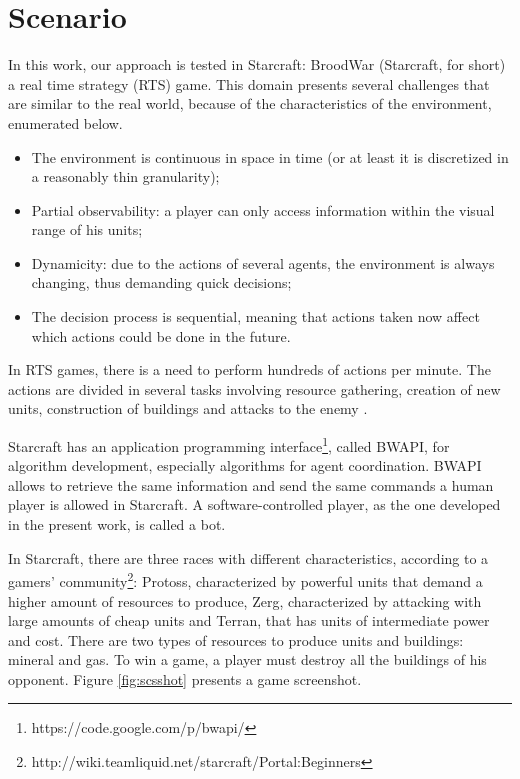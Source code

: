 \documentclass[conference]{IEEEtran}
\begin{document}
\section{Scenario}
\label{sec:scenario}

In this work, our approach is tested in Starcraft: BroodWar (Starcraft, for short) a real time strategy (RTS) game. This domain presents several challenges that are similar to the real world, because of the characteristics of the environment, enumerated below.

\begin{itemize}
	\item The environment is continuous in space in time (or at least it is discretized in a reasonably thin granularity);
	\item Partial observability: a player can only access information within the visual range of his units;
	\item Dynamicity: due to the actions of several agents, the environment is always changing, thus demanding quick decisions;
	\item The decision process is sequential, meaning that actions taken now affect which actions could be done in the future.
\end{itemize}

In RTS games, there is a need to perform hundreds of actions per minute. The actions are divided in several tasks involving resource gathering, creation of new units, construction of buildings and attacks to the enemy \cite{Weber+2011}.

Starcraft has an application programming interface\footnote{https://code.google.com/p/bwapi/}, called BWAPI, for algorithm development, especially algorithms for agent coordination. BWAPI allows to retrieve the same information and send the same commands a human player is allowed in Starcraft. A software-controlled player, as the one developed in the present work, is called a bot. 

In Starcraft, there are three races with different characteristics, according to a gamers' community\footnote{http://wiki.teamliquid.net/starcraft/Portal:Beginners}: Protoss, characterized by powerful units that demand a higher amount of resources to produce, Zerg, characterized by attacking with large amounts of cheap units and Terran, that has units of intermediate power and cost. There are two types of resources to produce units and buildings: mineral and gas. To win a game, a player must destroy all the buildings of his opponent. Figure \ref{fig:scsshot} presents a game screenshot.
\end{document}
